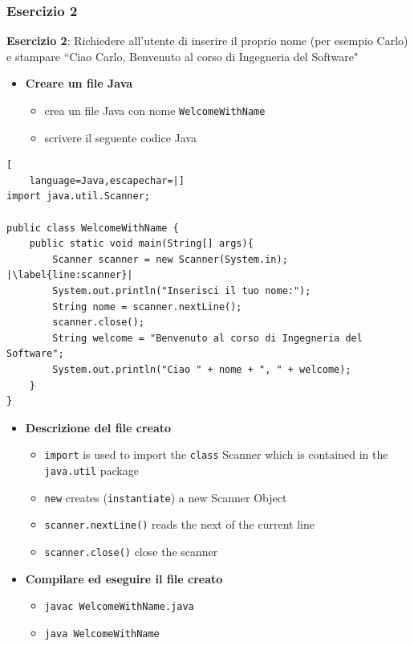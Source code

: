 \documentclass{article}
\theoremstyle{definition}
\begin{document}
\subsubsection{Esercizio 2}
\begin{framed}
\textbf{Esercizio 2}: Richiedere all'utente di inserire il proprio nome (per esempio Carlo) e stampare ``Ciao Carlo, Benvenuto al corso di Ingegneria del Software"
\end{framed}
\begin{itemize}
\item \textbf{Creare un file Java}
\begin{itemize}
\item crea un file Java con nome \texttt{WelcomeWithName}
\item scrivere il seguente codice Java
\end{itemize}
\end{itemize}
\begin{lstlisting}[
    language=Java,escapechar=|]
import java.util.Scanner;

public class WelcomeWithName {
	public static void main(String[] args){
		Scanner scanner = new Scanner(System.in); |\label{line:scanner}|
		System.out.println("Inserisci il tuo nome:");
		String nome = scanner.nextLine();
		scanner.close();
		String welcome = "Benvenuto al corso di Ingegneria del Software";
		System.out.println("Ciao " + nome + ", " + welcome);
	}
}
\end{lstlisting}
\begin{itemize}
\item \textbf{Descrizione del file creato}
\begin{itemize}
\item \texttt{import} is used to import the \texttt{class} Scanner which is contained in the \texttt{java.util} package
\item \texttt{new} creates (\texttt{instantiate}) a new Scanner Object
\item \texttt{scanner.nextLine()} reads the next of the current line
\item \texttt{scanner.close()} close the scanner
\end{itemize}
\end{itemize}

\begin{itemize}
\item  \textbf{Compilare ed eseguire il file creato}
\begin{itemize}
\item \texttt{javac WelcomeWithName.java}
\item \texttt{java WelcomeWithName}
\end{itemize}
\end{itemize}
\end{document}
